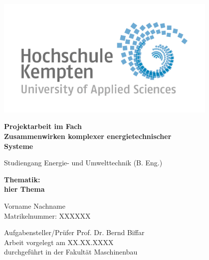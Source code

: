 \thispagestyle{empty}

\vspace*{-20mm}
\begin{center}
    \includegraphics[width=0.8\textwidth]{./Abbildungen/hs_logo_web.jpg}
\end{center}


\vspace*{2cm}

\begin{center}
{\Large \bfseries Projektarbeit im Fach\\} 
{\Large \bfseries \glqq Zusammenwirken komplexer energietechnischer\\}
{\Large \bfseries Systeme\grqq \\} 

\vspace*{1cm}

{\large Studiengang Energie- und Umwelttechnik (B. Eng.)\\[1mm]}

\vspace{1cm}

{\Large \bfseries Thematik:\\}
{\Large \bfseries hier Thema\\}


\vspace{1.5cm}

{\large Vorname Nachname}\\[5mm]
{\large Matrikelnummer: XXXXXX}\\[10mm]

\end{center}
\vfill

\begin{center}
\parbox{120mm}{
\begin{tabbing}
Aufgabensteller/Prüfer \hspace{.7cm} \= Prof. Dr. Bernd Biffar\\
Arbeit vorgelegt am                  \> XX.XX.XXXX \\
durchgeführt in der                  \> Fakultät Maschinenbau\\[4mm]
\end{tabbing}
}
\end{center}

